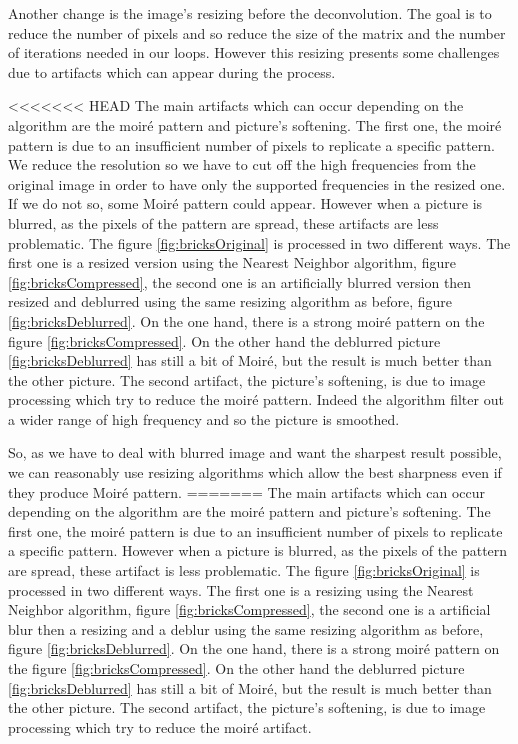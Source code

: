 Another change is the image's resizing before the deconvolution. The goal is to reduce the number of pixels and so reduce the size of the matrix and the number of iterations needed in our loops.  However this resizing presents some challenges due to artifacts which can appear during the process.

<<<<<<< HEAD
The main artifacts which can occur depending on the algorithm are the moiré pattern and picture's softening.  
The first one, the moiré pattern is due to an insufficient number of pixels to replicate a specific pattern. We reduce the resolution so we have to cut off the high frequencies from the original image in order to have only the supported frequencies in the resized one. If we do not so, some Moiré pattern could appear.  However when a picture is blurred, as the pixels of the pattern are spread, these artifacts are less problematic. The figure \ref{fig:bricksOriginal} is processed in two different ways. The first one is a resized version using the Nearest Neighbor algorithm, figure \ref{fig:bricksCompressed}, the second one is an artificially blurred version then resized and deblurred using the same resizing algorithm as before, figure \ref{fig:bricksDeblurred}. On the one hand, there is a strong moiré pattern on the figure \ref{fig:bricksCompressed}. On the other hand the deblurred picture \ref{fig:bricksDeblurred} has still a bit of Moiré, but the result is much better than the other picture. 
The second artifact, the picture's softening, is due to image processing which try to reduce the moiré pattern. Indeed the algorithm filter out a wider range of high frequency and so the picture is smoothed.  

So, as we have to deal with blurred image and want the sharpest result possible, we can reasonably use resizing algorithms which allow the best sharpness even if they produce Moiré pattern. 
=======
The main artifacts which can occur depending on the algorithm are the moiré pattern and picture's softening.
The first one, the moiré pattern is due to an insufficient number of pixels to replicate a specific pattern. However when a picture is blurred, as the pixels of the pattern are spread, these artifact is less problematic. The figure \ref{fig:bricksOriginal} is processed in two different ways. The first one is a resizing using the Nearest Neighbor algorithm, figure \ref{fig:bricksCompressed}, the second one is a artificial blur then a resizing and a deblur using the same resizing algorithm as before, figure \ref{fig:bricksDeblurred}. On the one hand, there is a strong moiré pattern on the figure \ref{fig:bricksCompressed}. On the other hand the deblurred picture \ref{fig:bricksDeblurred} has still a bit of Moiré, but the result is much better than the other picture.
The second artifact, the picture's softening, is due to image processing which try to reduce the moiré artifact.

